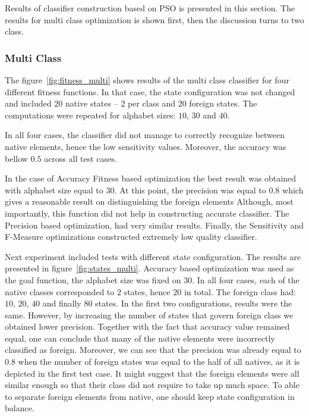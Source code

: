 \documentclass{mini}
\begin{document}
Results of classifier construction based on PSO is presented in this section. The results for multi class optimization is shown first, then the discussion turns to two class.

\subsubsection{Multi Class}

The figure~\ref{fig:fitness_multi} shows results of the multi class classifier for four different fitness functions. In that case, the state configuration was not changed and included $20$ native states -- $2$ per class and $20$ foreign states. The computations were repeated for alphabet sizes: $10$, $30$ and $40$.

In all four cases, the classifier did not manage to correctly recognize between native elements, hence the low sensitivity values. Moreover, the accuracy was bellow $0.5$ across all test cases. 

In the case of Accuracy Fitness based optimization the best result was obtained with alphabet size equal to $30$. At this point, the precision was equal to $0.8$ which gives a reasonable result on distinguishing the foreign elements Although, most importantly, this function did not help in constructing accurate classifier. The Precision based optimization, had very similar results. Finally, the Sensitivity and F-Measure optimizations constructed extremely low quality classifier.

Next experiment included tests with different state configuration. The results are presented in figure~\ref{fig:states_multi}. Accuracy based optimization was used as the goal function, the alphabet size was fixed on $30$. In all four cases, each of the native classes corresponded to $2$ states, hence $20$ in total. The foreign class had: $10$, $20$, $40$ and finally $80$ states. In the first two configurations, results were the same. However, by increasing the number of states that govern foreign class we obtained lower precision. Together with the fact that accuracy value remained equal, one can conclude that many of the native elements were incorrectly classified as foreign. Moreover, we can see that the precision was already equal to $0.8$ when the number of foreign states was equal to the half of all natives, as it is depicted in the first test case. It might suggest that the foreign elements were all similar enough so that their class did not require to take up much space. To able to separate foreign elements from native, one should keep state configuration in balance.
\end{document}
